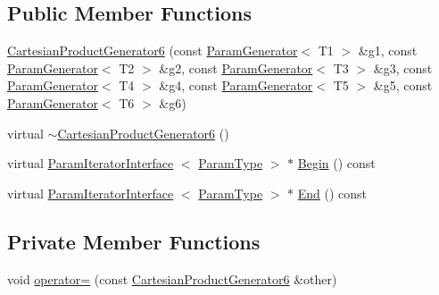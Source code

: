 \subsection*{\-Public \-Member \-Functions}
\begin{DoxyCompactItemize}
\item 
\hyperlink{classtesting_1_1internal_1_1CartesianProductGenerator6_ae203a563657ceb7ba56af238c03d7cd7}{\-Cartesian\-Product\-Generator6} (const \hyperlink{classtesting_1_1internal_1_1ParamGenerator}{\-Param\-Generator}$<$ \-T1 $>$ \&g1, const \hyperlink{classtesting_1_1internal_1_1ParamGenerator}{\-Param\-Generator}$<$ \-T2 $>$ \&g2, const \hyperlink{classtesting_1_1internal_1_1ParamGenerator}{\-Param\-Generator}$<$ \-T3 $>$ \&g3, const \hyperlink{classtesting_1_1internal_1_1ParamGenerator}{\-Param\-Generator}$<$ \-T4 $>$ \&g4, const \hyperlink{classtesting_1_1internal_1_1ParamGenerator}{\-Param\-Generator}$<$ \-T5 $>$ \&g5, const \hyperlink{classtesting_1_1internal_1_1ParamGenerator}{\-Param\-Generator}$<$ \-T6 $>$ \&g6)
\item 
virtual \hyperlink{classtesting_1_1internal_1_1CartesianProductGenerator6_ad45082fa4aa2fca6bf838254eddd11c2}{$\sim$\-Cartesian\-Product\-Generator6} ()
\item 
virtual \hyperlink{classtesting_1_1internal_1_1ParamIteratorInterface}{\-Param\-Iterator\-Interface}\*
$<$ \hyperlink{classtesting_1_1internal_1_1CartesianProductGenerator6_a2f46503012c4ef785ad3fe03defbc7e1}{\-Param\-Type} $>$ $\ast$ \hyperlink{classtesting_1_1internal_1_1CartesianProductGenerator6_ab6a1e6ee0c9095fec4ca7dd2fe9736cd}{\-Begin} () const 
\item 
virtual \hyperlink{classtesting_1_1internal_1_1ParamIteratorInterface}{\-Param\-Iterator\-Interface}\*
$<$ \hyperlink{classtesting_1_1internal_1_1CartesianProductGenerator6_a2f46503012c4ef785ad3fe03defbc7e1}{\-Param\-Type} $>$ $\ast$ \hyperlink{classtesting_1_1internal_1_1CartesianProductGenerator6_a2175654afa23856e885489861c353c72}{\-End} () const 
\end{DoxyCompactItemize}
\subsection*{\-Private \-Member \-Functions}
\begin{DoxyCompactItemize}
\item 
void \hyperlink{classtesting_1_1internal_1_1CartesianProductGenerator6_ac05f9b0c7b987129029dd0c82a80fa56}{operator=} (const \hyperlink{classtesting_1_1internal_1_1CartesianProductGenerator6}{\-Cartesian\-Product\-Generator6} \&other)
\end{DoxyCompactItemize}
